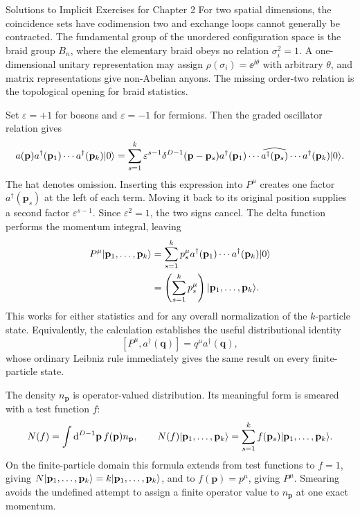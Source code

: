 \begin{bankssolutions}{Solutions to Implicit Exercises for Chapter 2}
For two spatial dimensions, the coincidence sets have codimension two and exchange loops cannot
generally be contracted. The fundamental group of the unordered configuration
space is the braid group $B_n$, where the elementary braid obeys no relation
$\sigma_i^2=1$. A one-dimensional unitary representation may assign
$\rho(\sigma_i)=\ee^{\ii\theta}$ with arbitrary $\theta$, and matrix
representations give non-Abelian anyons. The missing order-two relation is the
topological opening for braid statistics.

Set $\varepsilon=+1$ for bosons and $\varepsilon=-1$ for fermions. Then the
graded oscillator relation gives
\[
  a(\mathbf p)a^\dagger(\mathbf p_1)\cdots
  a^\dagger(\mathbf p_k)\lvert 0\rangle
  =\sum_{s=1}^k\varepsilon^{s-1}
  \delta^{D-1}(\mathbf p-\mathbf p_s)
  a^\dagger(\mathbf p_1)\cdots
  \widehat{a^\dagger(\mathbf p_s)}\cdots
  a^\dagger(\mathbf p_k)\lvert 0\rangle.
\]
The hat denotes omission. Inserting this expression into $P^\mu$ creates one
factor $a^\dagger(\mathbf p_s)$ at the left of each term. Moving it back to its
original position supplies a second factor $\varepsilon^{s-1}$. Since
$\varepsilon^2=1$, the two signs cancel. The delta function performs the
momentum integral, leaving
\begin{align*}
  P^\mu\lvert \mathbf p_1,\ldots,\mathbf p_k\rangle
  &=\sum_{s=1}^k p_s^\mu
    a^\dagger(\mathbf p_1)\cdots a^\dagger(\mathbf p_k)\lvert 0\rangle\\
  &=\left(\sum_{s=1}^k p_s^\mu\right)
    \lvert \mathbf p_1,\ldots,\mathbf p_k\rangle.
\end{align*}
This works for either statistics and for any overall normalization of the
$k$-particle state.
Equivalently, the calculation establishes the useful distributional identity
\[
  [P^\mu,a^\dagger(\mathbf q)]=q^\mu a^\dagger(\mathbf q),
\]
whose ordinary Leibniz rule immediately gives the same result on every
finite-particle state.

The density $n_{\mathbf p}$ is operator-valued distribution. Its meaningful
form is smeared with a test function $f$:
\[
  N(f)=\int\mathop{}\!\mathrm{d}^{D-1}\mathbf p\,f(\mathbf p)n_{\mathbf p},
  \qquad
  N(f)\lvert \mathbf p_1,\ldots,\mathbf p_k\rangle
  =\sum_{s=1}^k f(\mathbf p_s)\lvert \mathbf p_1,\ldots,\mathbf p_k\rangle.
\]
On the finite-particle domain this formula extends from test functions to
$f=1$, giving $N\lvert \mathbf p_1,\ldots,\mathbf p_k\rangle=k\lvert \mathbf p_1,\ldots,\mathbf p_k\rangle$, and to
$f(\mathbf p)=p^\mu$, giving $P^\mu$. Smearing avoids the undefined attempt to
assign a finite operator value to $n_{\mathbf p}$ at one exact momentum.


\end{bankssolutions}
